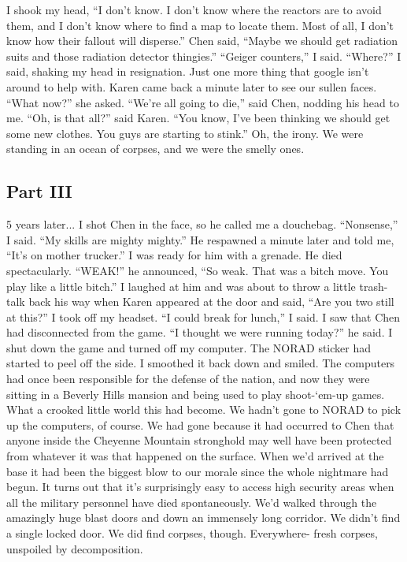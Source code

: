 \documentclass[a4paper]{article}
\begin{document}
I shook my head, “I don’t know. I don’t know where the reactors are to avoid them, and I don’t know where to find a map to locate them. Most of all, I don’t know how their fallout will disperse.”
Chen said, “Maybe we should get radiation suits and those radiation detector thingies.”
“Geiger counters,” I said.
“Where?” I said, shaking my head in resignation. Just one more thing that google isn’t around to help with.
Karen came back a minute later to see our sullen faces. “What now?” she asked.
“We’re all going to die,” said Chen, nodding his head to me.
“Oh, is that all?” said Karen. “You know, I’ve been thinking we should get some new clothes. You guys are starting to stink.”
Oh, the irony. We were standing in an ocean of corpses, and we were the smelly ones.

\subsection{Part III}
5 years later...
I shot Chen in the face, so he called me a douchebag.
“Nonsense,” I said. “My skills are mighty mighty.”
He respawned a minute later and told me, “It’s on mother trucker.”
I was ready for him with a grenade. He died spectacularly.
“WEAK!” he announced, “So weak. That was a bitch move. You play like a little bitch.”
I laughed at him and was about to throw a little trash-talk back his way when Karen appeared at the door and said, “Are you two still at this?”
I took off my headset. “I could break for lunch,” I said.
I saw that Chen had disconnected from the game. “I thought we were running today?” he said.
I shut down the game and turned off my computer. The NORAD sticker had started to peel off the side. I smoothed it back down and smiled.
The computers had once been responsible for the defense of the nation, and now they were sitting in a Beverly Hills mansion and being used to play shoot-‘em-up games. What a crooked little world this had become.
We hadn’t gone to NORAD to pick up the computers, of course. We had gone because it had occurred to Chen that anyone inside the Cheyenne Mountain stronghold may well have been protected from whatever it was that happened on the surface. When we’d arrived at the base it had been the biggest blow to our morale since the whole nightmare had begun.
It turns out that it’s surprisingly easy to access high security areas when all the military personnel have died spontaneously. We’d walked through the amazingly huge blast doors and down an immensely long corridor. We didn’t find a single locked door. We did find corpses, though. Everywhere- fresh corpses, unspoiled by decomposition.
\end{document}
